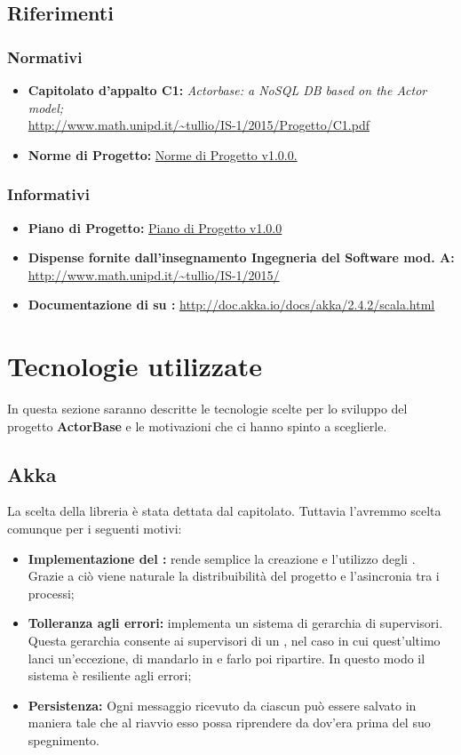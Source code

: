 \documentclass{scalatekids-article}
\begin{document}
\subsection{Riferimenti}
\subsubsection{Normativi}
\begin{itemize}
\item\textbf{Capitolato d'appalto C1:} \textit{Actorbase: a NoSQL DB based on the Actor model;}\\
  \url{http://www.math.unipd.it/~tullio/IS-1/2015/Progetto/C1.pdf}
\item\textbf{Norme di Progetto:} \href{run:../Interni/NormeDiProgetto\_v1.0.0.pdf}{Norme di Progetto v1.0.0.}
\end{itemize}
\subsubsection{Informativi}
\begin{itemize}
\item\textbf{Piano di Progetto:} \href{run:./PianoDiProgetto\_v1.0.0.pdf}{Piano di Progetto v1.0.0}
\item\textbf{Dispense fornite dall'insegnamento Ingegneria del Software mod. A:}\\
  \url{http://www.math.unipd.it/~tullio/IS-1/2015/}
\item\textbf{Documentazione di  su :}
  \url{http://doc.akka.io/docs/akka/2.4.2/scala.html}
\end{itemize}
\newpage
\section{Tecnologie utilizzate}
In questa sezione saranno descritte le tecnologie scelte per lo sviluppo del progetto \textbf{ActorBase} e le motivazioni che ci hanno spinto a sceglierle.
\subsection{Akka}
La scelta della libreria  è stata dettata dal capitolato. Tuttavia l'avremmo scelta comunque per i seguenti motivi:
\begin{itemize}
\item\textbf{Implementazione del :}  rende semplice la creazione e l'utilizzo degli . Grazie a ciò viene naturale la distribuibilità del progetto e l'asincronia tra i processi;
\item\textbf{Tolleranza agli errori:}  implementa un sistema di gerarchia di supervisori. Questa gerarchia consente ai supervisori di un , nel caso in cui quest'ultimo lanci un'eccezione, di mandarlo in  e farlo poi ripartire. In questo modo il sistema è resiliente agli errori;
\item\textbf{Persistenza:} Ogni messaggio ricevuto da ciascun  può essere salvato in maniera tale che al riavvio esso possa riprendere da dov'era prima del suo spegnimento.
\end{itemize}
\end{document}
